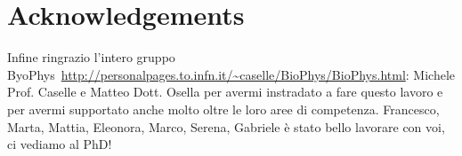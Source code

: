 \chapter*{Acknowledgements}

Infine ringrazio l'intero gruppo ByoPhys~\url{http://personalpages.to.infn.it/~caselle/BioPhys/BioPhys.html}: Michele Prof. Caselle e Matteo Dott. Osella per avermi instradato a fare questo lavoro e per avermi supportato anche molto oltre le loro aree di competenza.
Francesco, Marta, Mattia, Eleonora, Marco, Serena, Gabriele è stato bello lavorare con voi, ci vediamo al PhD!

